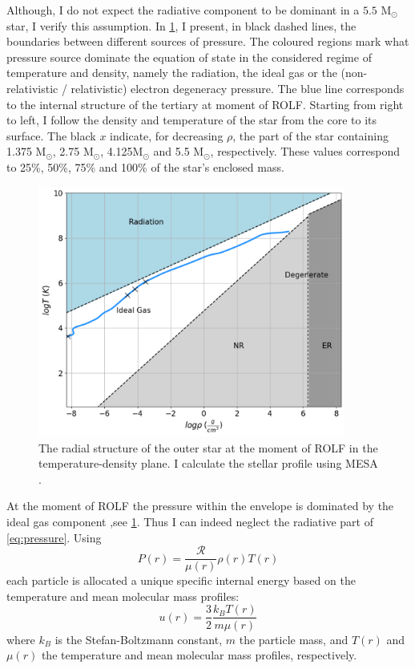 Although, I do not expect the radiative component to be dominant in a $5.5$ M$_{\odot}$ star, I verify this assumption. In \cref{fig:eos}, I present, in black dashed lines, the boundaries between different sources of pressure. The coloured regions mark what pressure source dominate the equation of state in the considered regime of temperature and density, namely the radiation, the ideal gas or the (non-relativistic / relativistic) electron degeneracy pressure. The blue line corresponds to the internal structure of the tertiary at moment of ROLF. Starting from right to left, I follow the density and temperature of the star from the core to its surface. The black $x$ indicate, for decreasing $\rho$, the part of the star containing 1.375 M$_{\odot}$, 2.75 M$_{\odot}$, 4.125M$_{\odot}$ and 5.5 M$_{\odot}$, respectively. These values correspond to 25\%, 50\%, 75\% and 100\% of the star's enclosed mass.
\begin{figure}[H]
    \centering
    \includegraphics[width=0.9\textwidth]{Thesis/graphs/eos.pdf}
    \caption{ The radial structure of the outer star at the moment of ROLF in the  temperature-density plane. I calculate the stellar profile using MESA \citep{paxton2010modules,paxton2013modules,paxton2015modules,paxton2019modules}.}
    \label{fig:eos}
\end{figure}
At the moment of ROLF the pressure within the envelope is dominated by the ideal gas component ,see \cref{fig:eos}. Thus I can indeed neglect the radiative part of \eqref{eq:pressure}. Using
\begin{equation}\label{eq:pressure_ideal_gass}
    P(r) =  \frac{\mathcal{R}}{\mu(r)} \rho(r) T(r)
\end{equation}
each particle is allocated a unique specific internal energy based on the temperature and mean molecular mass profiles:
\begin{equation}\label{eq:internal_energy}
    u(r) = \frac{3}{2} \frac{k_B T(r)}{m \mu(r)}
\end{equation}
where $k_B$ is the Stefan-Boltzmann constant, $m$ the particle mass, and $T(r)$ and $\mu(r)$ the temperature and mean molecular mass profiles, respectively.

